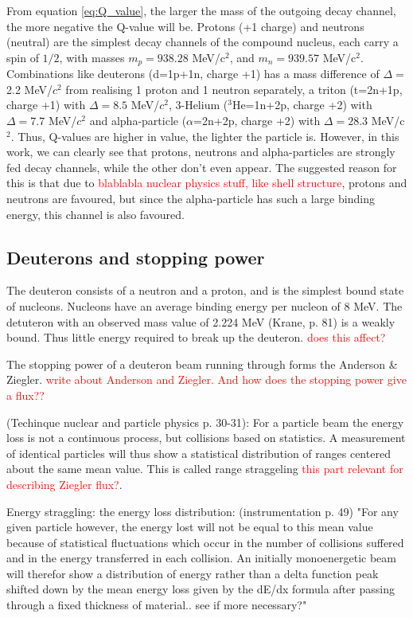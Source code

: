 \documentclass[a4paper,11pt,twoside]{book}
\begin{document}
From equation \ref{eq:Q_value}, the larger the mass of the outgoing decay channel, the more negative the Q-value will be. Protons (+1 charge) and neutrons (neutral) are the simplest decay channels of the compound nucleus, each carry a spin of $1/2$, with masses $m_p=938.28$ MeV/c$^2$, and $m_n=939.57$ MeV/c$^2$. Combinations like deuterons (d=1p+1n, charge +1) has a mass difference of $\Delta=$2.2 MeV/$c^2$ from realising 1 proton and 1 neutron separately, a triton (t=2n+1p, charge +1) with $\Delta=8.5$ MeV/$c^2$,  3-Helium ($^{3}$He=1n+2p, charge +2) with $\Delta=7.7$ MeV/$c^2$ and alpha-particle ($\alpha$=2n+2p, charge +2) with $\Delta=28.3$ MeV/c$^2$. Thus, Q-values are higher in value, the lighter the particle is. However, in this work, we can clearly see that protons, neutrons and alpha-particles are strongly fed decay channels, while the other don't even appear. The suggested reason for this is that due to \textcolor{red}{blablabla nuclear physics stuff, like shell structure}, protons and neutrons are favoured, but since the alpha-particle has such a large binding energy, this channel is also favoured.  

\subsection{Deuterons and stopping power}

The deuteron consists of a neutron and a proton, and is the simplest bound state of nucleons. Nucleons have an average binding energy per nucleon of 8 MeV. The detuteron with an observed mass value of 2.224 MeV (Krane, p. 81) is a weakly bound. Thus little energy required to break up the deuteron. \textcolor{red}{does this affect?}

The stopping power of a deuteron beam running through forms the Anderson \& Ziegler. \textcolor{red}{write about Anderson and Ziegler. And how does the stopping power give a flux??}


(Techinque nuclear and particle physics p. 30-31):  
For a particle beam the energy loss is not a continuous process, but collisions based on statistics. A measurement of identical particles will thus show a statistical distribution of ranges centered about the same mean value. This is called range straggeling \textcolor{red}{this part relevant for describing Ziegler flux?}. 

Energy straggling: the energy loss distribution: (instrumentation p. 49)
"For any given particle however, the energy lost will not be equal to this mean value because of statistical fluctuations which occur in the number of collisions suffered and in the energy transferred in each collision. An initially monoenergetic beam will therefor show a distribution of energy rather than a delta function peak shifted down by the mean energy loss given by the dE/dx formula after passing through a fixed thickness of material.. see if more necessary?"
\end{document}
